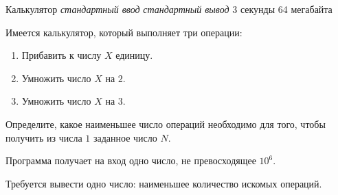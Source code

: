 \begin{problem}%
{Калькулятор}%
{\textsl{стандартный ввод}}%
{\textsl{стандартный вывод}}%
{3 секунды}%
{64 мегабайта}%
{}

Имеется калькулятор, который выполняет три операции:

\begin{enumerate}
\item Прибавить к числу $X$ единицу.
\item Умножить число $X$ на $2$.
\item Умножить число $X$ на $3$.
\end{enumerate}

Определите, какое наименьшее число операций необходимо для того, чтобы получить из числа $1$ заданное число $N$.

\InputFile

Программа получает на вход одно число, не превосходящее $10^6$.

\OutputFile

Требуется вывести одно число: наименьшее количество искомых операций.

\Examples

\begin{example}
%
%
%
\end{example}

\end{problem}
